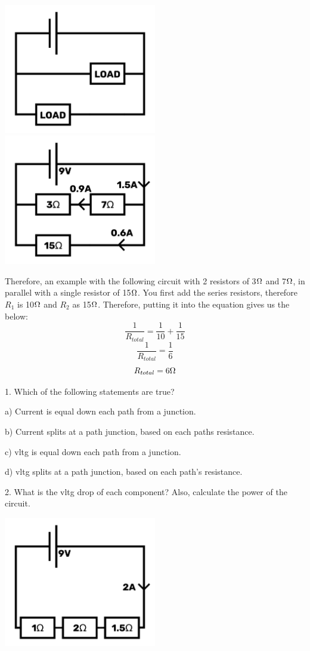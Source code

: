 \documentclass[a4paper,11pt]{report}
\newcommand{\Quiz}[1] %
{
\par\noindent %
\phantomsection %
\todo[inline, color=blue!30]{\textbf{#1}} %
\vspace{1em} %
}
\begin{document}
\includegraphics[width=0.5\textwidth]{parallel1}
\includegraphics[width=0.5\textwidth]{parallel2}

Therefore, an example with the following circuit with 2 resistors of 3$\ohm$ and 7$\ohm$, in parallel with a single resistor of 15$\ohm$. You first add the series resistors, therefore $R_1$ is 10$\ohm$ and $R_2$ as 15$\ohm$. Therefore, putting it into the equation gives us the below:
\[\frac{1}{R_{total}} = \frac{1}{10} + \frac{1}{15}\]
\[\frac{1}{R_{total}} = \frac{1}{6}\]
\[R_{total} = 6\ohm\]

\Quiz{Quiz}

1. Which of the following statements are true?

a) Current is equal down each path from a junction.

b) Current splits at a path junction, based on each paths resistance.

c) \gls{vltg} is equal down each path from a junction.

d) \gls{vltg} splits at a path junction, based on each path's resistance.

2. What is the \gls{vltg} drop of each component? Also, calculate the power of the circuit.

\includegraphics[width=0.5\textwidth]{series3}
\end{document}
